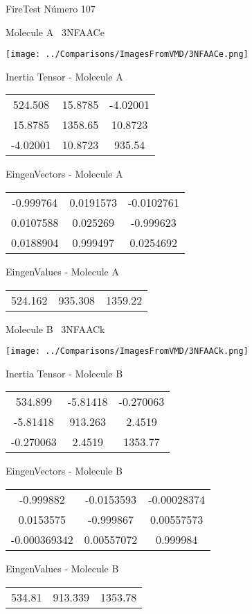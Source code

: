 \vtab[-3cm]
\begin{center}
{\large FireTest \tab Número 107}
\end{center}
\begin{multicols}{2}
\begin{center}

Molecule A \
3NFAACe

\texttt{[image: ../Comparisons/ImagesFromVMD/3NFAACe.png]}

Inertia Tensor - Molecule A \\
\begin{tabular}{|c c c|}
524.508	 & 	15.8785	 & 	-4.02001	 \\
15.8785	 & 	1358.65	 & 	10.8723	 \\
-4.02001	 & 	10.8723	 & 	935.54
\end{tabular}

\vtab
 EingenVectors - Molecule A     \\
\begin{tabular}{|c c c|}
-0.999764	 & 	0.0191573	 & 	-0.0102761	 \\
0.0107588	 & 	0.025269	 & 	-0.999623	 \\
0.0188904	 & 	0.999497	 & 	0.0254692
\end{tabular}

\vtab
 EingenValues - Molecule A     \\
\begin{tabular}{|c c c|}
524.162	 & 	935.308	 & 	1359.22	 \\
\end{tabular}
\columnbreak

Molecule B \
3NFAACk

\texttt{[image: ../Comparisons/ImagesFromVMD/3NFAACk.png]}

Inertia Tensor - Molecule B \\
\begin{tabular}{|c c c|}
534.899	 & 	-5.81418	 & 	-0.270063	 \\
-5.81418	 & 	913.263	 & 	2.4519	 \\
-0.270063	 & 	2.4519	 & 	1353.77
\end{tabular}

\vtab
 EingenVectors - Molecule B     \\
\begin{tabular}{|c c c|}
-0.999882	 & 	-0.0153593	 & 	-0.00028374	 \\
0.0153575	 & 	-0.999867	 & 	0.00557573	 \\
-0.000369342	 & 	0.00557072	 & 	0.999984
\end{tabular}

\vtab
 EingenValues - Molecule B     \\
\begin{tabular}{|c c c|}
534.81	 & 	913.339	 & 	1353.78	 \\
\end{tabular}

\end{center}
\end{multicols}

